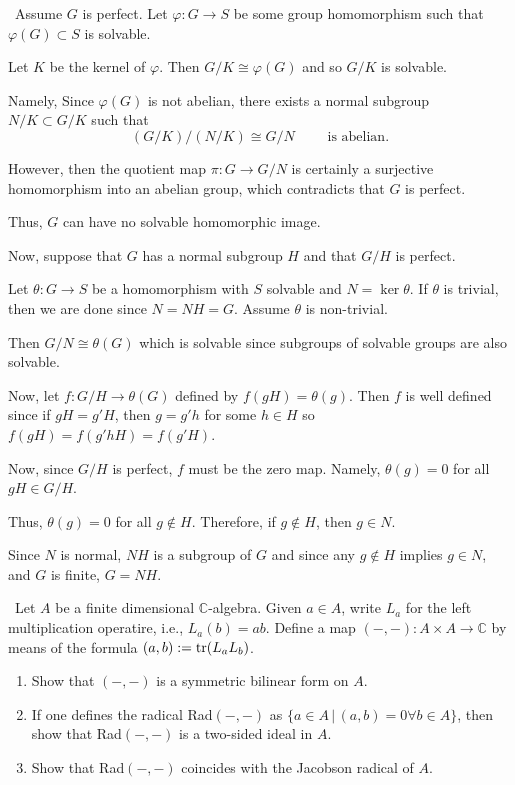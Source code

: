 \documentclass[12pt]{Qual}
\begin{document}
\begin{solution}$\,$
Assume $G$ is perfect. Let $\varphi:G\to S$ be some group homomorphism such that $\varphi(G)\subset S$ is solvable.

Let $K$ be the kernel of $\varphi$. Then $G/K\cong\varphi(G)$ and so $G/K$ is solvable.

Namely, Since $\varphi(G)$ is not abelian, there exists a normal subgroup $N/K\subset G/K$ such that $$(G/K)/(N/K)\cong G/N\qquad\text{ is abelian}.$$

However, then the quotient map $\pi:G\to G/N$ is certainly a surjective homomorphism into an abelian group, which contradicts that $G$ is perfect.

Thus, $G$ can have no solvable homomorphic image.

Now, suppose that $G$ has a normal subgroup $H$ and that $G/H$ is perfect.

Let $\theta:G\to S$ be a homomorphism with $S$ solvable and $N=\ker\theta$. If $\theta$ is trivial, then we are done since $N=NH=G$. Assume $\theta$ is non-trivial.

Then $G/N\cong\theta(G)$ which is solvable since subgroups of solvable groups are also solvable.

Now, let $f:G/H\to\theta(G)$ defined by $f(gH)=\theta(g)$. Then $f$ is well defined since if $gH=g'H$, then $g=g'h$ for some $h\in H$ so $f(gH)=f(g'hH)=f(g'H)$.

Now, since $G/H$ is perfect, $f$ must be the zero map. Namely, $\theta(g)=0$ for all $gH\in G/H$.

Thus, $\theta(g)=0$ for all $g\notin H$. Therefore, if $g\notin H$, then $g\in N$.

Since $N$ is normal, $NH$ is a subgroup of $G$ and since any $g\notin H$ implies $g\in N$, and $G$ is finite, $G=NH$.
\end{solution}
\newpage



\begin{problem} $\,$
Let $A$ be a finite dimensional $\mathbb{C}$-algebra. Given $a\in A$, write $L_a$ for the left multiplication operatire, i.e., $L_a(b)=ab.$ Define a map $(-,-):A\times A\to\mathbb{C}$ by means of the formula $(a,b):=\text{tr}(L_aL_b)$.
\begin{enumerate}[label=(\alph*)]
    \item Show that $(-,-)$ is a symmetric bilinear form on $A.$
    \item If one defines the radical Rad$(-,-)$ as $\{a\in A\,|\,(a,b)=0 \forall b\in A\}$, then show that Rad$(-,-)$ is a two-sided ideal in $A$.
    \item Show that Rad$(-,-)$ coincides with the Jacobson radical of $A$.
\end{enumerate}
\end{problem}
\end{document}
